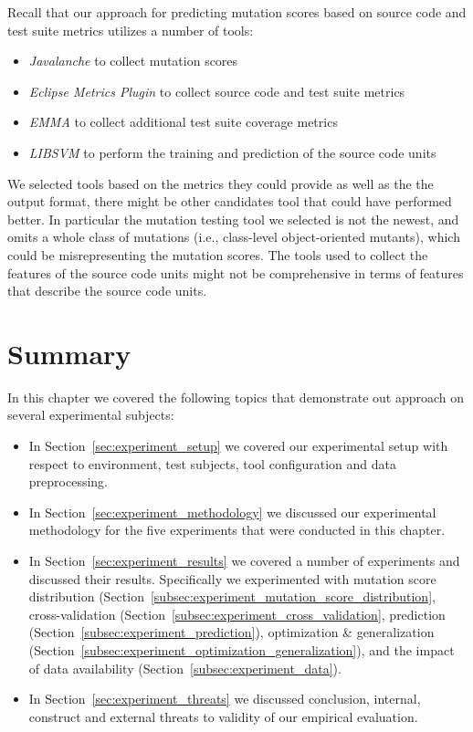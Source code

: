 Recall that our approach for predicting mutation scores based on source code and test suite metrics utilizes a number of tools:

\begin{itemize}
  \item \emph{Javalanche} to collect mutation scores
  \item \emph{Eclipse Metrics Plugin} to collect source code and test suite metrics
  \item \emph{EMMA} to collect additional test suite coverage metrics
  \item \emph{LIBSVM} to perform the training and prediction of the source code units
\end{itemize}

We selected tools based on the metrics they could provide as well as the the output format, there might be other candidates tool that could have performed better. In particular the mutation testing tool we selected is not the newest, and omits a whole class of mutations (i.e., class-level object-oriented mutants), which could be misrepresenting the mutation scores. The tools used to collect the features of the source code units might not be comprehensive in terms of features that describe the source code units.


\section{Summary}
\label{sec:experiment_summary}
In this chapter we covered the following topics that demonstrate out approach on several experimental subjects:

\begin{itemize}
  \item In Section~\ref{sec:experiment_setup} we covered our experimental setup with respect to environment, test subjects, tool configuration and data preprocessing.
  \item In Section~\ref{sec:experiment_methodology} we discussed our experimental methodology for the five experiments that were conducted in this chapter.
  \item In Section~\ref{sec:experiment_results} we covered a number of experiments and discussed their results. Specifically we experimented with mutation score distribution (Section~\ref{subsec:experiment_mutation_score_distribution}, cross-validation (Section~\ref{subsec:experiment_cross_validation}, prediction (Section~\ref{subsec:experiment_prediction}), optimization \& generalization (Section~\ref{subsec:experiment_optimization_generalization}), and the impact of data availability (Section~\ref{subsec:experiment_data}).
  \item In Section~\ref{sec:experiment_threats} we discussed conclusion, internal, construct and external threats to validity of our empirical evaluation.
\end{itemize}
